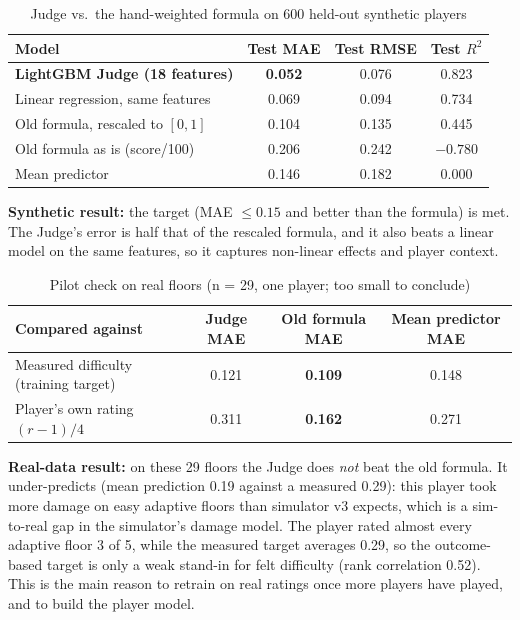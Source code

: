 \begin{table}[!htbp]
\centering
\caption{Judge vs.\ the hand-weighted formula on 600 held-out synthetic players}
\label{tab:judge_synth}
\small
\begin{tabular}{lccc}
\toprule
\textbf{Model} & \textbf{Test MAE} & \textbf{Test RMSE} & \textbf{Test $R^2$} \\
\midrule
\textbf{LightGBM Judge (18 features)} & \textbf{0.052} & 0.076 & 0.823 \\
Linear regression, same features & 0.069 & 0.094 & 0.734 \\
Old formula, rescaled to $[0,1]$ & 0.104 & 0.135 & 0.445 \\
Old formula as is (score/100) & 0.206 & 0.242 & $-0.780$ \\
Mean predictor & 0.146 & 0.182 & 0.000 \\
\bottomrule
\end{tabular}
\end{table}

\textbf{Synthetic result:} the target (MAE $\le 0.15$ and better than the formula) is met. The Judge's error is half that of the rescaled formula, and it also beats a linear model on the same features, so it captures non-linear effects and player context.

\begin{table}[!htbp]
\centering
\caption{Pilot check on real floors (n = 29, one player; too small to conclude)}
\label{tab:judge_real}
\small
\begin{tabular}{lccc}
\toprule
\textbf{Compared against} & \textbf{Judge MAE} & \textbf{Old formula MAE} & \textbf{Mean predictor MAE} \\
\midrule
Measured difficulty (training target) & 0.121 & \textbf{0.109} & 0.148 \\
Player's own rating $(r-1)/4$ & 0.311 & \textbf{0.162} & 0.271 \\
\bottomrule
\end{tabular}
\end{table}

\textbf{Real-data result:} on these 29 floors the Judge does \emph{not} beat the old formula. It under-predicts (mean prediction 0.19 against a measured 0.29): this player took more damage on easy adaptive floors than simulator v3 expects, which is a sim-to-real gap in the simulator's damage model. The player rated almost every adaptive floor 3 of 5, while the measured target averages 0.29, so the outcome-based target is only a weak stand-in for felt difficulty (rank correlation 0.52). This is the main reason to retrain on real ratings once more players have played, and to build the player model.

